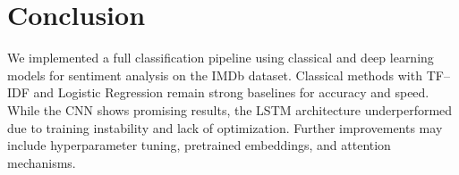 \documentclass[12pt,a4paper]{article}
\begin{document}
\section{Conclusion}
We implemented a full classification pipeline using classical and deep learning models for sentiment analysis on the IMDb dataset. Classical methods with TF–IDF and Logistic Regression remain strong baselines for accuracy and speed. While the CNN shows promising results, the LSTM architecture underperformed due to training instability and lack of optimization. Further improvements may include hyperparameter tuning, pretrained embeddings, and attention mechanisms.
\end{document}

